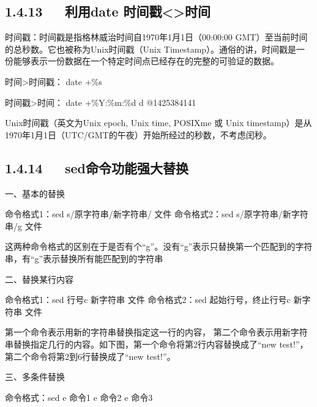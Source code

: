 \documentclass[letterpaper,12pt,english]{sphinxmanual}
\begin{document}
\subsection{1.4.13   利用date 时间戳<\sphinxhyphen{}>时间}
\label{\detokenize{001software/001install/linux:id28}}
时间戳：时间戳是指格林威治时间自1970年1月1日（00:00:00 GMT）至当前时间的总秒数。它也被称为Unix时间戳（Unix Timestamp）。通俗的讲，时间戳是一份能够表示一份数据在一个特定时间点已经存在的完整的可验证的数据。

时间\sphinxhyphen{}>时间戳： date +\%s

时间戳\sphinxhyphen{}>时间： date +\%Y:\%m:\%d \sphinxhyphen{}d @1425384141

Unix时间戳（英文为Unix epoch, Unix time, POSIXme 或 Unix timestamp）是从1970年1月1日（UTC/GMT的午夜）开始所经过的秒数，不考虑闰秒。


\subsection{1.4.14   sed命令功能强大替换}
\label{\detokenize{001software/001install/linux:id29}}
一、基本的替换

\begin{sphinxVerbatim}[commandchars=\\\{\}]
命令格式1：sed \PYGZsq{}s/原字符串/新字符串/\PYGZsq{} 文件
命令格式2：sed \PYGZsq{}s/原字符串/新字符串/g\PYGZsq{} 文件
\end{sphinxVerbatim}

这两种命令格式的区别在于是否有个“g”。没有“g”表示只替换第一个匹配到的字符串，有“g”表示替换所有能匹配到的字符串

二、替换某行内容

\begin{sphinxVerbatim}[commandchars=\\\{\}]
命令格式1：sed \PYGZsq{}行号c 新字符串\PYGZsq{} 文件
命令格式2：sed \PYGZsq{}起始行号，终止行号c 新字符串\PYGZsq{} 文件
\end{sphinxVerbatim}

第一个命令表示用新的字符串替换指定这一行的内容， 第二个命令表示用新字符串替换指定几行的内容。如下图，第一个命令将第2行内容替换成了“new test!”，第二个命令将第2到6行替换成了“new test!”。

三、多条件替换

\begin{sphinxVerbatim}[commandchars=\\\{\}]
命令格式：sed \PYGZhy{}e 命令1 \PYGZhy{}e 命令2 \PYGZhy{}e 命令3
\end{sphinxVerbatim}
\end{document}
